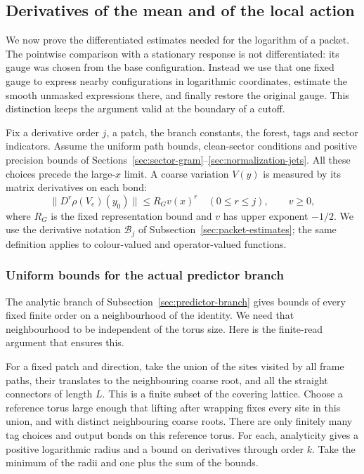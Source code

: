 \subsection{Derivatives of the mean and of the local action}
\label{sec:mean-action-jets}
We now prove the differentiated estimates needed for the logarithm of
a packet. The pointwise comparison with a stationary response is not
differentiated: its gauge was chosen from the base configuration.
Instead we use that one fixed gauge to express nearby configurations
in logarithmic coordinates, estimate the smooth unmasked expressions
there, and finally restore the original gauge. This distinction keeps
the argument valid at the boundary of a cutoff.

Fix a derivative order $j$, a patch, the branch constants, the forest,
tags and sector indicators. Assume the uniform path bounds, clean-sector
conditions and positive precision bounds of
Sections~\ref{sec:sector-gram}--\ref{sec:normalization-jets}.
All these choices precede the large-$x$ limit. A coarse variation
$V(y)$ is measured by its matrix derivatives on each bond:
\[
 \|D^r\rho(V_e)(y_0)\|\le R_G v(x)^r\quad(0\le r\le j),
 \qquad v\ge0,
\]
where $R_G$ is the fixed representation bound and $v$ has upper
exponent $-1/2$. We use the derivative notation $\mathcal B_j$ of
Subsection~\ref{sec:packet-estimates}; the same definition applies to
colour-valued and operator-valued functions.

\subsubsection{Uniform bounds for the actual predictor branch}
The analytic branch of Subsection~\ref{sec:predictor-branch} gives bounds
of every fixed finite order on a neighbourhood of the identity.
We need that neighbourhood to be independent of the torus size.
Here is the finite-read argument that ensures this.

For a fixed patch and direction, take the union of the sites visited
by all frame paths, their translates to the neighbouring coarse
root, and all the straight connectors of length $L$. This is a
finite subset of the covering lattice. Choose a reference torus
large enough that lifting after wrapping fixes every site in this
union, and with distinct neighbouring coarse roots. There are only
finitely many tag choices and output bonds on this reference torus.
For each, analyticity gives a positive logarithmic radius and a
bound on derivatives through order $k$. Take the minimum of the
radii and one plus the sum of the bounds.

